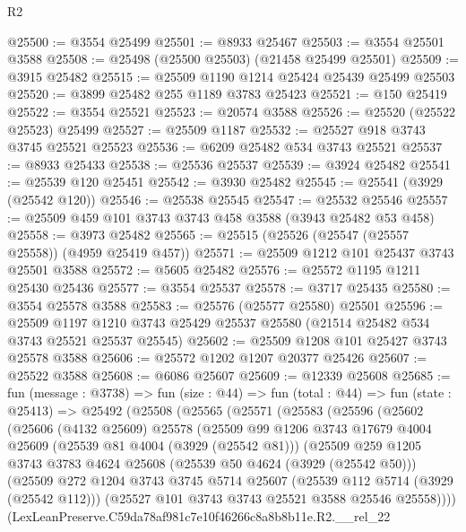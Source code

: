 \begin{lexlean}{R2}
\begin{coremodule}
@25500 := @3554 @25499
@25501 := @8933 @25467
@25503 := @3554 @25501 @3588
@25508 := @25498 (@25500 @25503) (@21458 @25499 @25501)
@25509 := @3915 @25482
@25515 := @25509 @1190 @1214 @25424 @25439 @25499 @25503
@25520 := @3899 @25482 @255 @1189 @3783 @25423
@25521 := @150 @25419
@25522 := @3554 @25521
@25523 := @20574 @3588
@25526 := @25520 (@25522 @25523) @25499
@25527 := @25509 @1187
@25532 := @25527 @918 @3743 @3745 @25521 @25523
@25536 := @6209 @25482 @534 @3743 @25521
@25537 := @8933 @25433
@25538 := @25536 @25537
@25539 := @3924 @25482
@25541 := @25539 @120 @25451
@25542 := @3930 @25482
@25545 := @25541 (@3929 (@25542 @120))
@25546 := @25538 @25545
@25547 := @25532 @25546
@25557 := @25509 @459 @101 @3743 @3743 @458 @3588 (@3943 @25482 @53 @458)
@25558 := @3973 @25482
@25565 := @25515 (@25526 (@25547 (@25557 @25558)) (@4959 @25419 @457))
@25571 := @25509 @1212 @101 @25437 @3743 @25501 @3588
@25572 := @5605 @25482
@25576 := @25572 @1195 @1211 @25430 @25436
@25577 := @3554 @25537
@25578 := @3717 @25435
@25580 := @3554 @25578 @3588
@25583 := @25576 (@25577 @25580) @25501
@25596 := @25509
    @1197
    @1210
    @3743
    @25429
    @25537
    @25580
    (@21514 @25482 @534 @3743 @25521 @25537 @25545)
@25602 := @25509 @1208 @101 @25427 @3743 @25578 @3588
@25606 := @25572 @1202 @1207 @20377 @25426
@25607 := @25522 @3588
@25608 := @6086 @25607
@25609 := @12339 @25608
@25685 := fun (message : @3738) =>
  fun (size : @44) =>
  fun (total : @44) =>
  fun (state : @25413) =>
  @25492
    (@25508
      (@25565
        (@25571
          (@25583
            (@25596
              (@25602
                (@25606
                  (@4132 @25609)
                  @25578
                  (@25509
                    @99
                    @1206
                    @3743
                    @17679
                    @4004
                    @25609
                    (@25539 @81 @4004 (@3929 (@25542 @81)))
                    (@25509
                      @259
                      @1205
                      @3743
                      @3783
                      @4624
                      @25608
                      (@25539 @50 @4624 (@3929 (@25542 @50)))
                      (@25509
                        @272
                        @1204
                        @3743
                        @3745
                        @5714
                        @25607
                        (@25539 @112 @5714 (@3929 (@25542 @112)))
                        (@25527 @101 @3743 @3743 @25521 @3588 @25546 @25558))))
                  (LexLeanPreserve.C59da78af981c7e10f46266c8a8b8b11e.R2.__rel_22

\end{coremodule}
\end{lexlean}
